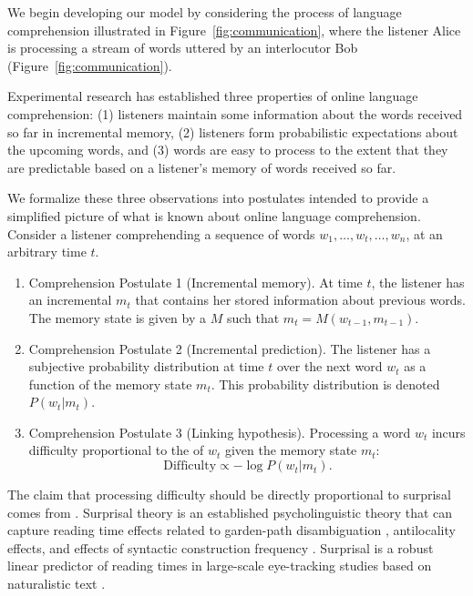 We begin developing our model by considering the process of language comprehension illustrated in Figure~\ref{fig:communication}, where the listener Alice is processing a stream of words uttered by an interlocutor Bob (Figure~\ref{fig:communication}). 

Experimental research has established three properties of online language comprehension: (1) listeners maintain some information about the words received so far in incremental memory, (2) listeners form probabilistic expectations about the upcoming words, and (3) words are easy to process to the extent that they are predictable based on a listener's memory of words received so far.

We formalize these three observations into postulates intended to provide a simplified picture of what is known about online language comprehension. Consider a listener comprehending a sequence of words $w_1, \dots, w_t, \dots, w_n$, at an arbitrary time $t$.
\begin{enumerate}
    \item Comprehension Postulate 1 (Incremental memory). At time $t$, the listener has an incremental  $m_t$ that contains her stored information about previous words. The memory state is given by a  $M$ such that $m_t = M(w_{t-1}, m_{t-1})$.
    \item Comprehension Postulate 2 (Incremental prediction). The listener has a subjective probability distribution at time $t$ over the next word $w_t$ as a function of the memory state $m_t$. This probability distribution is denoted $P(w_t|m_t)$.
    \item Comprehension Postulate 3 (Linking hypothesis). Processing a word $w_t$ incurs difficulty proportional to the  of $w_t$ given the memory state $m_t$:
    \begin{equation}
    \label{eq:lossy-surp}
    \text{Difficulty} \propto -\log P(w_t | m_t).
\end{equation}
\end{enumerate}
The claim that processing difficulty should be directly proportional to surprisal comes from . Surprisal theory is an established psycholinguistic theory that can capture reading time effects related to garden-path disambiguation \citep{hale2001probabilistic}, antilocality effects, and effects of syntactic construction frequency \citep{levy2008expectation}. Surprisal is a robust linear predictor of reading times in large-scale eye-tracking studies based on naturalistic text \citep{smith-effect-2013,goodkind-predictive-2018}.

